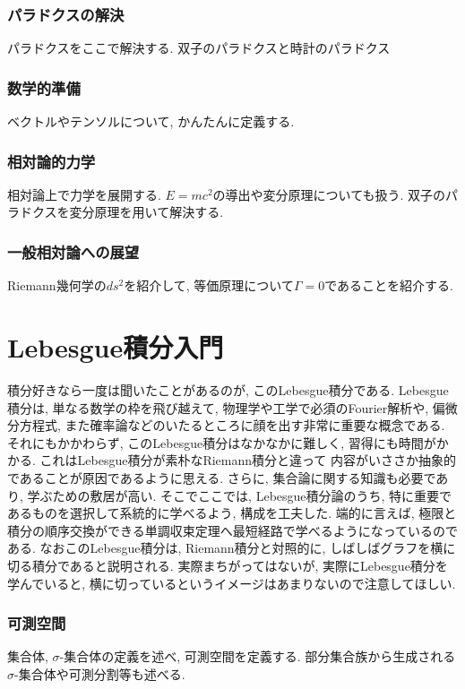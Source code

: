 \documentclass[a4j,dvipdfmx]{jsarticle}
\numberwithin{equation}{section}
\begin{document}
    \section{パラドクスの解決}
        パラドクスをここで解決する. 双子のパラドクスと時計のパラドクス
    \clearpage
    \section{数学的準備}
        ベクトルやテンソルについて, かんたんに定義する.
    \clearpage
    \section{相対論的力学}
        相対論上で力学を展開する. $E=mc^2$の導出や変分原理についても扱う. 双子のパラドクスを変分原理を用いて解決する.
    \clearpage
    \section{一般相対論への展望}
        Riemann幾何学の$ds^2$を紹介して, 等価原理について$\Gamma=0$であることを紹介する.
    \clearpage

    \part{Lebesgue積分入門}
    \begin{screen}
        積分好きなら一度は聞いたことがあるのが, このLebesgue積分である. Lebesgue積分は, 単なる数学の枠を飛び越えて, 
        物理学や工学で必須のFourier解析や, 偏微分方程式, また確率論などのいたるところに顔を出す非常に重要な概念である.
        それにもかかわらず, このLebesgue積分はなかなかに難しく, 習得にも時間がかかる. これはLebesgue積分が素朴なRiemann積分と違って
        内容がいささか抽象的であることが原因であるように思える. さらに, 集合論に関する知識も必要であり, 学ぶための敷居が高い.
        そこでここでは, Lebesgue積分論のうち, 特に重要であるものを選択して系統的に学べるよう, 構成を工夫した. 
        端的に言えば, 極限と積分の順序交換ができる単調収束定理へ最短経路で学べるようになっているのである.
        なおこのLebesgue積分は, Riemann積分と対照的に, しばしばグラフを横に切る積分であると説明される. 実際まちがってはないが, 
        実際にLebesgue積分を学んでいると, 横に切っているというイメージはあまりないので注意してほしい.
    \end{screen}
    \clearpage
    \section{可測空間}
        集合体, $\sigma$-集合体の定義を述べ, 可測空間を定義する. 部分集合族から生成される$\sigma$-集合体や可測分割等も述べる.
    \clearpage
\end{document}
